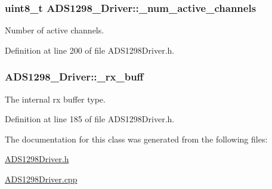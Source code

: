 \hypertarget{class_a_d_s1298___driver_adffccf9bfd40ec402181967dd2a6291f}{
\subsubsection[{\-\_\-num\-\_\-active\-\_\-channels}]{\setlength{\rightskip}{0pt plus 5cm}uint8\-\_\-t {\bf \-A\-D\-S1298\-\_\-\-Driver\-::\-\_\-num\-\_\-active\-\_\-channels}}}\label{class_a_d_s1298___driver_adffccf9bfd40ec402181967dd2a6291f}


\-Number of active channels. 



\-Definition at line 200 of file \-A\-D\-S1298\-Driver.\-h.

\hypertarget{class_a_d_s1298___driver_ab7156a79b770bfa6d44e753e5d81ceb7}{
\subsubsection[{\-\_\-rx\-\_\-buff}]{ {\bf \-A\-D\-S1298\-\_\-\-Driver\-::\-\_\-rx\-\_\-buff}}}\label{class_a_d_s1298___driver_ab7156a79b770bfa6d44e753e5d81ceb7}


\-The internal rx buffer type. 



\-Definition at line 185 of file \-A\-D\-S1298\-Driver.\-h.



\-The documentation for this class was generated from the following files\-:\begin{DoxyCompactItemize}
\item 
\hyperlink{_a_d_s1298_driver_8h}{\-A\-D\-S1298\-Driver.\-h}\item 
\hyperlink{_a_d_s1298_driver_8cpp}{\-A\-D\-S1298\-Driver.\-cpp}\end{DoxyCompactItemize}
